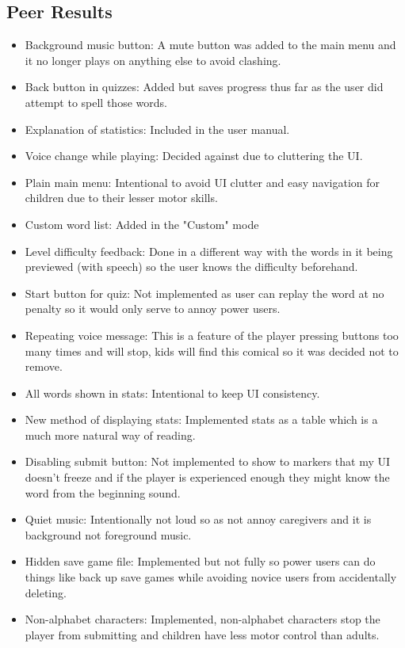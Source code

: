 \documentclass[conference]{IEEEtran}
\begin{document}
	\subsection{Peer Results}
	\begin{itemize}
		\item Background music button: A mute button was added to the main menu and it no longer plays on anything else to avoid clashing.
		\item Back button in quizzes: Added but saves progress thus far as the user did attempt to spell those words.
		\item Explanation of statistics: Included in the user manual.
		\item Voice change while playing: Decided against due to cluttering the UI.
		\item Plain main menu: Intentional to avoid UI clutter and easy navigation for children due to their lesser motor skills.
		\item Custom word list: Added in the "Custom" mode
		\item Level difficulty feedback: Done in a different way with the words in it being previewed (with speech) so the user knows the difficulty beforehand.
		\item Start button for quiz: Not implemented as user can replay the word at no penalty so it would only serve to annoy power users.
		\item Repeating voice message: This is a feature of the player pressing buttons too many times and will stop, kids will find this comical so it was decided not to remove.
		\item All words shown in stats: Intentional to keep UI consistency.
		\item New method of displaying stats: Implemented stats as a table which is a much more natural way of reading.
		\item Disabling submit button: Not implemented to show to markers that my UI doesn't freeze and if the player is experienced enough they might know the word from the beginning sound. 
		\item Quiet music: Intentionally not loud so as not annoy caregivers and it is background not foreground music.
		\item Hidden save game file: Implemented but not fully so power users can do things like back up save games while avoiding novice users from accidentally deleting.
		\item Non-alphabet characters: Implemented, non-alphabet characters stop the player from submitting and children have less motor control than adults.

\end{itemize}
\end{document}
